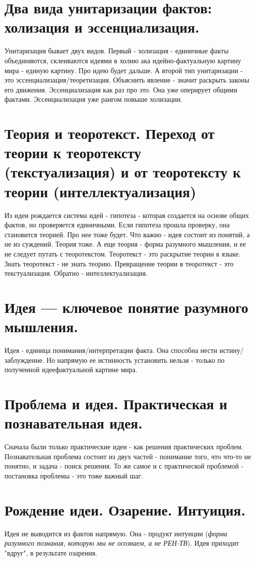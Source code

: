 \section{ Два вида унитаризации фактов: холизация и эссенциализация.}
Унитаризация бывает двух видов. Первый - холизация - единичные факты объединяются, склеиваются идеями  в холию ака идейно-фактуальную картину мира - единую картину. Про идею будет дальше. А второй тип унитаризации - это эссенциализация/теоретизация. Объяснить явление - значит раскрыть законы его движения. Эссенциализация как раз про это. Она уже оперирует общими фактами. Эссенциализация уже рангом повыше холизации.

\section{ Теория и теоротекст. Переход от теории к теоротексту (текстуализация) и от теоротексту к теории (интеллектуализация)}
Из идеи рождается система идей - гипотеза - которая создается на основе общих фактов, но проверяется единичными. Если гипотеза прошла проверку, она становится теорией. Про нее тоже будет. Что важно - идея состоит из понятий, а не из суждений. Теория тоже. А еще теория - форма разумного мышления, и ее не следует путать с теоротекстом. Теоротекст - это раскрытие теории в языке. Знать теоротекст - не знать теорию. Превращение теории в теоротекст - это текстуализация. Обратно - интеллектуализация.

\section{ Идея — ключевое понятие разумного мышления.}
Идея - единица понимания/интерпретации факта. Она способна нести истину/заблуждение. Но напрямую ее истинность установить нельзя - только по полученной идеефактуальной картине мира.

\section{ Проблема и идея. Практическая и познавательная идея.}
Сначала были только практические идеи - как решения практических проблем. Познавательная проблема состоит из двух частей - понимание того, что что-то не понятно, и задача - поиск решения. То же самое и с практической проблемой - постановка проблемы - это тоже важный шаг.

\section{ Рождение идеи. Озарение. Интуиция.}
Идея не выводится из фактов напрямую. Она - продукт интуиции (\textit{форма разумного познания, которую мы не осознаем, а не РЕН-ТВ}). Идея приходит "вдруг", в результате озарения. 

